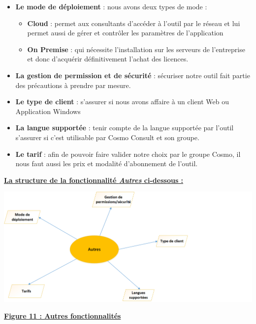 \documentclass[11pt]{report}
\begin{document}
\begin{itemize}
	\item \textbf{Le mode de déploiement} : nous avons deux types de mode :
	\begin{itemize}
		\item \textbf{Cloud} : permet aux consultants d’accéder à l’outil par le réseau et lui permet aussi de gérer et contrôler les paramètres de l’application
		
		\item \textbf{On Premise} : qui nécessite l’installation sur les serveurs de l’entreprise et donc d’acquérir définitivement l’achat des licences.
	\end{itemize}
	
	\item \textbf{La gestion de permission et de sécurité} : sécuriser notre outil fait partie des précautions à prendre par mesure.

	\item \textbf{Le type de client} : s’assurer si nous avons affaire à un client Web ou Application Windows

	\item \textbf{La langue supportée} : tenir compte de la langue supportée par l’outil s’assurer si c’est utilisable par Cosmo Consult et son groupe. 

	\item \textbf{Le tarif} : afin de pouvoir faire valider notre choix par le groupe Cosmo, il nous faut aussi les prix et modalité d’abonnement de l’outil.	
\end{itemize}
\quad

\begin{center}
\underline{\textbf{La structure de la fonctionnalité \textit{Autres} ci-dessous :}}
\end{center}
\begin{center}
\includegraphics[scale=0.7]{images/figure11.png} 
\quad

\underline{\textbf{Figure 11 : Autres fonctionnalités}}
\end{center}
\quad
\end{document}
